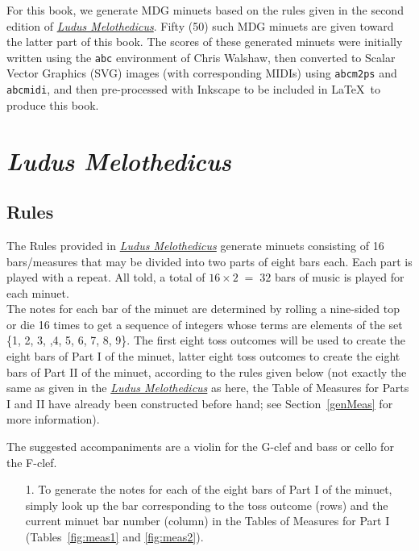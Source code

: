 \documentclass[a4paper,x11names,svgnames,10pt]{article}
\begin{document}
{For this book, we generate MDG minuets based on the rules given in the second edition of \href{https://imslp.org/wiki/Ludus_Melothedicus_(Anonymous)}{{\em Ludus Melothedicus}}.  Fifty (50) such MDG minuets are given toward the latter part of this book. The scores of these generated minuets were initially written using the \texttt{abc} environment of Chris Walshaw, then converted to Scalar Vector Graphics (SVG) images (with corresponding MIDIs) using {\tt abcm2ps} and {\tt abcmidi}, and then pre-processed with Inkscape to be included in \LaTeX\ to produce this book.


\section{\em Ludus Melothedicus}

\subsection{Rules}\label{mdgRules}

The Rules provided in \href{https://imslp.org/wiki/Ludus_Melothedicus_(Anonymous)}{{\em Ludus Melothedicus}} generate minuets consisting of 16 bars/measures that may be divided into two parts of eight bars each. Each part is played with a repeat. All told, a total of $16 \times 2 \;=\; 32$ bars of music is played for each minuet. \\

The notes for each bar of the minuet are determined by rolling a nine-sided top or die 16 times to get a sequence of integers whose terms are elements of the set \{1, 2, 3, ,4, 5, 6, 7, 8, 9\}. The first eight toss outcomes will be used to create the eight bars of Part I of the minuet, latter eight toss outcomes to create the eight bars of Part II of the minuet, according to the rules given below (not exactly the same as given in the \href{https://imslp.org/wiki/Ludus_Melothedicus_(Anonymous)}{{\em Ludus Melothedicus}} as here, the Table of Measures for Parts I and II have already been constructed before hand; see Section~\ref*{genMeas} for more information). 

The suggested accompaniments are a violin for the G-clef and bass or cello for the F-clef.

\begin{enumerate}
	\item [1.\label{step1}] To generate the notes for each of the eight bars of Part I of the minuet, simply look up the bar corresponding to the toss outcome (rows) and the current minuet bar number (column) in the Tables of Measures for Part I (Tables~\ref{fig:meas1} and \ref{fig:meas2}).  
	

\end{enumerate}}
\end{document}
